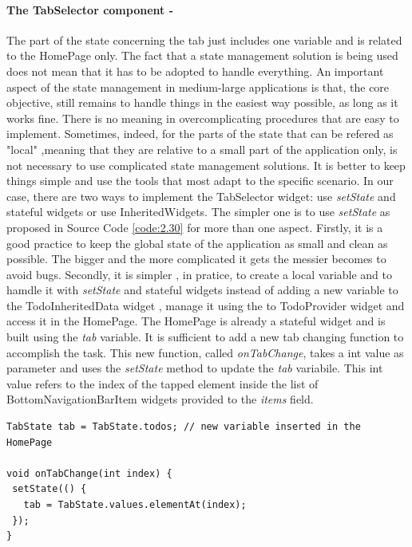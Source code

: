 \paragraph{The TabSelector component - }
\label{subpar:todo_app_inherited_widget_tabselector_component}
The part of the state concerning the tab just includes  one variable and is related to the HomePage only. The fact that a state management solution is being used does not mean that it has to be adopted to handle everything. An important aspect of the state management in medium-large applications is that, the core objective, still remains to handle things in the easiest way possible, as long as it works fine. There is no meaning in overcomplicating procedures that are easy to implement. Sometimes, indeed, for the parts of the state that can be refered as "local" ,meaning that they are relative to a small part of the application only, is not necessary to use complicated state management solutions. It is better to keep things simple and use the tools that most adapt to the specific scenario.
In our case, there are two ways to implement the TabSelector widget: use \textit{setState} and stateful widgets or use InheritedWidgets. The simpler one is to use \textit{setState} as proposed in Source Code \ref{code:2.30} for more than one aspect. Firstly, it is a good practice to keep the global state of the application as small and clean as possible. The bigger and the more complicated it gets the messier becomes to avoid bugs. Secondly, it is simpler , in pratice, to create a local variable and to hamdle it with \textit{setState} and stateful widgets instead of adding a new variable to the TodoInheritedData widget , manage it using the to TodoProvider widget and access it in the HomePage. The HomePage is already a stateful widget and is built using the \textit{tab }variable. It is sufficient to add a new tab changing function to accomplish the task. This new function, called \textit{onTabChange}, takes a int value as parameter and uses the \textit{setState} method to update the \textit{tab} variabile. This int value refers to the index of the tapped element inside the list of BottomNavigationBarItem widgets provided to the \textit{items} field.
\mbox{}\\
\begin{code}
\mbox{}
\label{code:2.30}
\begin{verbatim}
TabState tab = TabState.todos; // new variable inserted in the HomePage

void onTabChange(int index) {
 setState(() {
   tab = TabState.values.elementAt(index);
 });
}
\end{verbatim}
\end{code}
